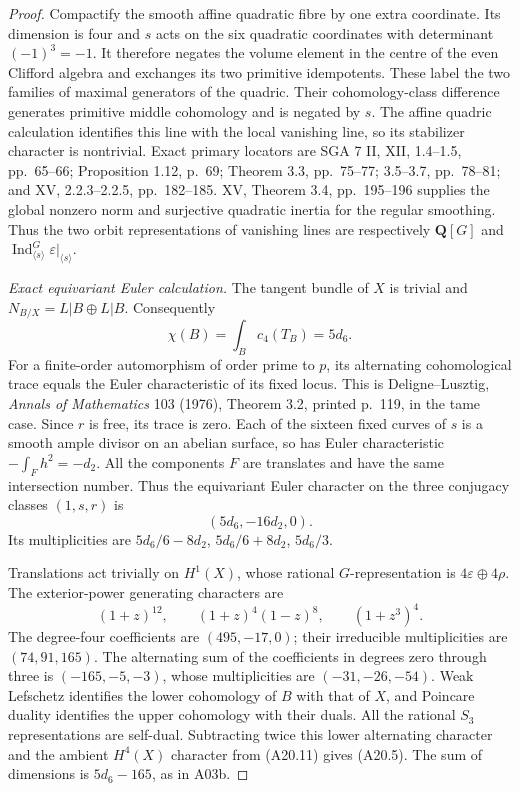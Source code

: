 \documentclass[11pt]{article}
\theoremstyle{remark}\newtheorem{remark}[theorem]{Remark}
\begin{document}
\begin{proof}
Compactify the smooth affine quadratic fibre by one
extra coordinate. Its dimension is four and $s$ acts
on the six quadratic coordinates with determinant
$(-1)^3=-1$. It therefore negates the volume element
in the centre of the even Clifford algebra and
exchanges its two primitive idempotents. These label
the two families of maximal generators of the quadric.
Their cohomology-class difference generates primitive
middle cohomology and is negated by $s$. The affine
quadric calculation identifies this line with the
local vanishing line, so its stabilizer character is
nontrivial. Exact primary locators are SGA 7 II,
XII, 1.4--1.5, pp.~65--66; Proposition 1.12, p.~69;
Theorem 3.3, pp.~75--77; 3.5--3.7, pp.~78--81;
and XV, 2.2.3--2.2.5, pp.~182--185. XV, Theorem 3.4,
pp.~195--196 supplies the global nonzero norm and
surjective quadratic inertia for the regular smoothing.
Thus the two orbit representations of vanishing lines
are respectively $\mathbf Q[G]$ and
$\operatorname{Ind}_{\langle s\rangle}^G\varepsilon|_{\langle s\rangle}$.

\emph{Exact equivariant Euler calculation.}
The tangent bundle of $X$ is trivial and
$N_{B/X}=L|B\oplus L|B$. Consequently
\[
                  \chi(B)=\int_Bc_4(T_B)=5d_6.
 \tag{A20.10}
\]
For a finite-order automorphism of order prime to $p$,
its alternating cohomological trace equals the Euler
characteristic of its fixed locus. This is
Deligne--Lusztig, \emph{Annals of Mathematics} 103
(1976), Theorem 3.2, printed p.~119, in the tame case.
Since $r$ is free, its trace is zero. Each of the
sixteen fixed curves of $s$ is a smooth ample divisor
on an abelian surface, so has Euler characteristic
$-\int_Fh^2=-d_2$. All the components $F$ are translates
and have the same intersection number. Thus the
equivariant Euler character on the three conjugacy
classes $(1,s,r)$ is
\[
                            (5d_6,-16d_2,0).
 \tag{A20.11}
\]
Its multiplicities are
$5d_6/6-8d_2$, $5d_6/6+8d_2$, $5d_6/3$.

Translations act trivially on $H^1(X)$, whose rational
$G$-representation is $4\varepsilon\oplus4\rho$.
The exterior-power generating characters are
\[
 (1+z)^{12},\qquad(1+z)^4(1-z)^8,\qquad(1+z^3)^4.
 \tag{A20.12}
\]
The degree-four coefficients are $(495,-17,0)$;
their irreducible multiplicities are $(74,91,165)$.
The alternating sum of the coefficients in degrees
zero through three is $(-165,-5,-3)$, whose
multiplicities are $(-31,-26,-54)$.
Weak Lefschetz identifies the lower cohomology of
$B$ with that of $X$, and Poincare duality identifies
the upper cohomology with their duals. All the rational
$S_3$ representations are self-dual. Subtracting twice
this lower alternating character and the ambient
$H^4(X)$ character from (A20.11) gives (A20.5).
The sum of dimensions is $5d_6-165$, as in A03b.


\end{proof}
\end{document}
